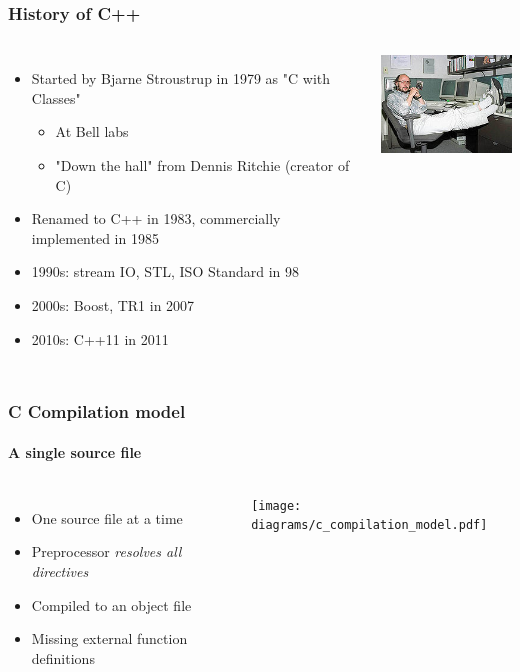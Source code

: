 \documentclass[table]{beamer}
\begin{document}
\begin{frame}
    \frametitle{History of C++}
    \begin{columns}[t]
        \column{7cm}
        \begin{itemize}
            \item<1->Started by Bjarne Stroustrup in 1979 as "C with Classes"
                \begin{itemize}
                    \item At Bell labs
                    \item "Down the hall" from Dennis Ritchie (creator of C)
                \end{itemize}
            \item<1->Renamed to C++ in 1983, commercially implemented in 1985
            \item<2->1990s: stream IO, STL, ISO Standard in 98
            \item<3->2000s: Boost, TR1 in 2007
            \item<4->2010s: C++11 in 2011
        \end{itemize}
        \column[T]{4cm}
        \includegraphics[width=4cm]{220px-BjarneStroustrup.jpg}
    \end{columns}
\end{frame}

\begin{frame}
    \frametitle{C Compilation model}
    \framesubtitle{A single source file}
    \begin{columns}[t]
        \column{4cm}
        \begin{itemize}
            \item One source file at a time
            \item Preprocessor \emph{resolves all directives}
            \item Compiled to an object file
            \item Missing external function definitions
        \end{itemize}
        \column[T]{8cm}
        \texttt{[image: diagrams/c\_compilation\_model.pdf]}
    \end{columns}
\end{frame}
\end{document}
